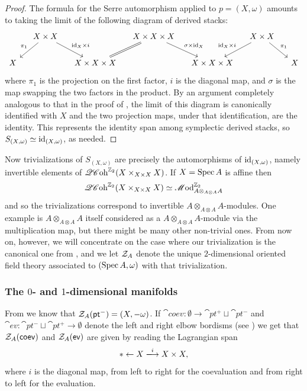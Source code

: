 \begin{proof}
	The formula for the Serre automorphism applied to $p = (X, \omega)$ amounts to taking the limit of the following diagram of derived stacks:
	\begin{equation*}
		\begin{tikzcd}[column sep = small]
			& X \times X \ar[dl, "\pi_1"'] \ar[dr, "\id_X \times i"] & & X \times X \times X \ar[dl, equal] \ar[dr, "\sigma \times \id_X"] & & X \times X \ar[dl, "\id_X \times i"'] \ar[dr, "\pi_1"] & \\
			X & & X \times X \times X & & X \times X \times X & & X
		\end{tikzcd}
	\end{equation*}
	where $\pi_1$ is the projection on the first factor, $i$ is the diagonal map, and $\sigma$ is the map swapping the two factors in the product. By an argument completely analogous to that in the proof of \cite[Lemma 12.3]{Haugseng2018}, the limit of this diagram is canonically identified with $X$ and the two projection maps, under that identification, are the identity. This represents the identity span among symplectic derived stacks, so $S_{(X, \omega)} \simeq \mathrm{id}_{(X, \omega)}$, as needed.
\end{proof}

Now trivializations of $S_{(X, \omega)}$ are precisely the automorphisms of $\mathrm{id}_{(X, \omega)}$, namely invertible elements of $\mathscr{QC}\mathrm{oh}^{\mathbb{Z}_2}(X \times_{X \times X} X)$. If $X = \operatorname{Spec} A$ is affine then 
\begin{equation*}
	\mathscr{QC}\mathrm{oh}^{\mathbb{Z}_2}(X \times_{X \times X} X) \simeq \mathscr{M}\mathrm{od}^{\mathbb{Z}_2}_{A \otimes_{A \otimes A} A}
\end{equation*}
and so the trivializations correspond to invertible $A \otimes_{A \otimes A} A$-modules. One example is $A \otimes_{A \otimes A} A$ itself considered as a $A \otimes_{A \otimes A} A$-module via the multiplication map, but there might be many other non-trivial ones. From now on, however, we will concentrate on the case where our trivialization is the canonical one from , and we let $\mathcal{Z}_A$ denote the unique $2$-dimensional oriented field theory associated to $(\operatorname{Spec} A, \omega)$ with that trivialization. 

\subsubsection{The $0$- and $1$-dimensional manifolds} 

From  we know that $\mathcal{Z}_A(\mathsf{pt}^-) = (X, -\omega)$. If $\cat{coev} : \emptyset \to \cat{pt}^+ \sqcup \cat{pt}^-$ and $\cat{ev} : \cat{pt}^- \sqcup \cat{pt}^+ \to \emptyset$ denote the left and right elbow bordisms (see ) we get that $\mathcal{Z}_A(\mathsf{coev})$ and $\mathcal{Z}_A(\mathsf{ev})$ are given by reading the Lagrangian span
\begin{equation*}
	\ast \leftarrow X \xlra{i} X \times X,
\end{equation*}
where $i$ is the diagonal map, from left to right for the coevaluation and from right to left for the evaluation. 

